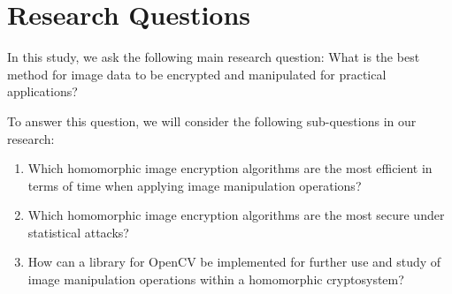 \section{Research Questions}

In this study, we ask the following main research question: What is the best method for image data to be encrypted and manipulated for practical applications?

To answer this question, we will consider the following sub-questions in our research:
\begin{enumerate}
    \item Which homomorphic image encryption algorithms are the most efficient in terms of time when applying image manipulation operations?
    \item Which homomorphic image encryption algorithms are the most secure under statistical attacks?
    \item How can a library for OpenCV be implemented for further use and study of image manipulation operations within a homomorphic cryptosystem?
\end{enumerate}
